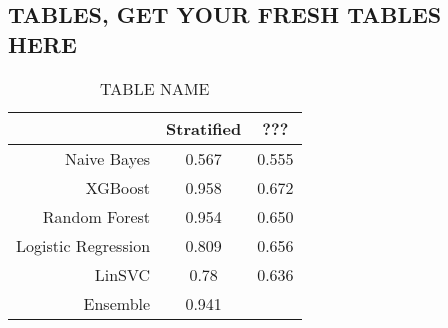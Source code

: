 \subsection{TABLES, GET YOUR FRESH TABLES HERE}
\begin{table}[H]
\begin{center} 
	\begin{tabular}{r|c|c}
		\toprule
		& Stratified & ??? \\
		\midrule
		Naive Bayes & 0.567 & 0.555 \\
		XGBoost & 0.958 & 0.672 \\
		Random Forest & 0.954 & 0.650 \\
		Logistic Regression & 0.809 & 0.656 \\
		LinSVC & 0.78 & 0.636 \\
		Ensemble & 0.941 & \\
		\bottomrule
	\end{tabular}
\end{center}
\caption{TABLE NAME}
\end{table}
